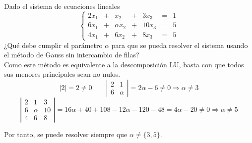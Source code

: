 \documentclass[12pt]{article}
\begin{document}
    \begin{ejercicio} 
    Dado el sistema de ecuaciones lineales
    \begin{equation*}
        \left\{ \begin{array}{rrrrrrr}
            2x_1 & + & x_2 & + & 3x_3 &=& 1  \\
            6x_1 & + & \alpha x_2 & + & 10x_3 &=&  5 \\
            4x_1 & + & 6x_2 & + & 8x_3 &=&  5
        \end{array}\right.
    \end{equation*}
    ¿Qué debe cumplir el parámetro $\alpha$ para que se pueda resolver el sistema usando el método de Gauss sin intercambio de filas?\\

    Como este método es equivalente a la descomposición LU, basta con que todos sus menores principales sean no nulos.
    \begin{equation*}
        |2|=2\neq 0 \qquad \left|\begin{array}{cc}
            2 & 1 \\
            6 & \alpha
        \end{array} \right| = 2\alpha-6 \neq 0 \Longrightarrow \alpha \neq 3
    \end{equation*}
    \begin{equation*}
        \left|\begin{array}{ccc}
            2 & 1 & 3\\
            6 & \alpha & 10 \\
            4 & 6 & 8    
        \end{array} \right| = 16\alpha +40 +108-12\alpha-120-48 = 4\alpha -20 \neq 0 \Longrightarrow \alpha\neq 5
    \end{equation*}

    Por tanto, se puede resolver siempre que $\alpha \neq \{3,5\}$. 
    

\end{ejercicio}
\end{document}
